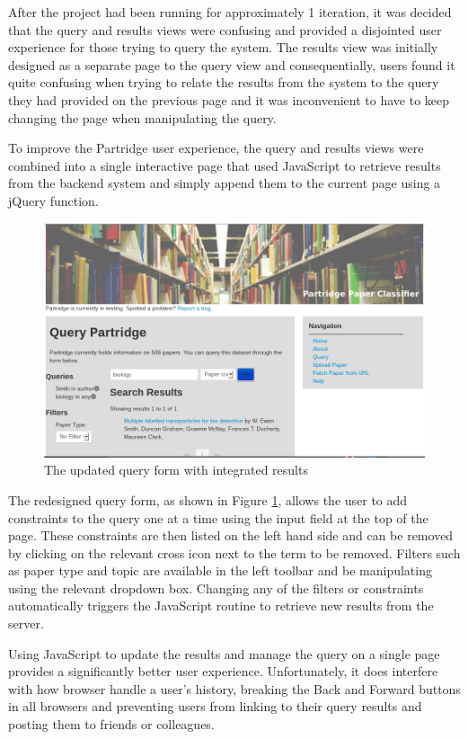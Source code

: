 After the project had been running for approximately 1 iteration, it was
decided that the query and results views were confusing and provided a
disjointed user experience for those trying to query the system. The results
view was initially designed as a separate page to the query view and
consequentially, users found it quite confusing when trying to relate the
results from the system to the query they had provided on the previous page and
it was inconvenient to have to keep changing the page when manipulating the
query. 

To improve the Partridge user experience, the query and results views were
combined into a single interactive page that used JavaScript to retrieve
results from the backend system and simply append them to the current page
using a jQuery function.

\begin{figure}[!h]
\centering
\includegraphics[width=\textwidth]{images/implementation/queryform_actual.png}
\caption{The updated query form with integrated results}
\label{fig:queryform_actual}
\end{figure}

The redesigned query form, as shown in Figure \ref{fig:queryform_actual},
allows the user to add constraints to the query one at a time using the input
field at the top of the page. These constraints are then listed on the left
hand side and can be removed by clicking on the relevant cross icon next to the
term to be removed. Filters such as paper type and topic are available in the
left toolbar and be manipulating using the relevant dropdown box. Changing any
of the filters or constraints automatically triggers the JavaScript routine to
retrieve new results from the server.

Using JavaScript to update the results and manage the query on a single page
provides a significantly better user experience. Unfortunately, it does
interfere with how browser handle a user's history, breaking the Back and
Forward buttons in all browsers and preventing users from linking to their
query results and posting them to friends or colleagues.

